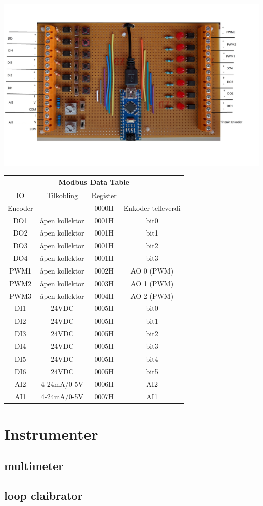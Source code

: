 \documentclass[10pt,a5paper]{article}
\begin{document}
\includegraphics[width=1\textwidth]{./GandRioTrainer.jpg}
\small
\begin{tabular}{|c|c|c|c|}
\hline 
\multicolumn{4}{|c|}{Modbus Data Table}\tabularnewline
\hline 
\hline 
IO & Tilkobling & Register & \tabularnewline
\hline 
Encoder &  & 0000H & Enkoder telleverdi\tabularnewline
\hline 
DO1 & åpen kollektor & 0001H & bit0\tabularnewline
\hline 
DO2 & åpen kollektor & 0001H & bit1\tabularnewline
\hline 
DO3 & åpen kollektor & 0001H & bit2\tabularnewline
\hline 
DO4 & åpen kollektor & 0001H & bit3\tabularnewline
\hline 
PWM1 & åpen kollektor & 0002H & AO 0 (PWM)\tabularnewline
\hline 
PWM2 & åpen kollektor & 0003H & AO 1 (PWM)\tabularnewline
\hline 
PWM3 & åpen kollektor & 0004H & AO 2 (PWM)\tabularnewline
\hline 
DI1 & 24VDC & 0005H & bit0\tabularnewline
\hline 
DI2 & 24VDC & 0005H & bit1\tabularnewline
\hline 
DI3 & 24VDC & 0005H & bit2\tabularnewline
\hline 
DI4 & 24VDC & 0005H & bit3\tabularnewline
\hline 
DI5 & 24VDC & 0005H & bit4\tabularnewline
\hline 
DI6 & 24VDC & 0005H & bit5\tabularnewline
\hline 
AI2 & 4-24mA/0-5V & 0006H & AI2\tabularnewline
\hline 
AI1 & 4-24mA/0-5V & 0007H & AI1\tabularnewline
\hline 
\end{tabular}
\normalsize
\vfil \eject
\section{Instrumenter}
\subsection{multimeter}
\subsection{loop claibrator}
\end{document}
